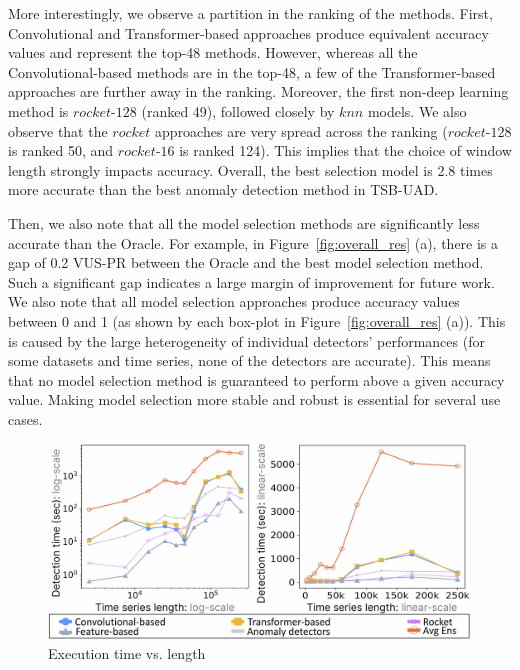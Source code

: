 More interestingly, we observe a partition in the ranking of the methods. First, Convolutional and Transformer-based approaches produce equivalent accuracy values and represent the top-48 methods. However, whereas all the Convolutional-based methods are in the top-48, a few of the Transformer-based approaches are further away in the ranking. Moreover, the first non-deep learning method is $rocket$-$128$ (ranked 49), followed closely by $knn$ models. We also observe that the $rocket$ approaches are very spread across the ranking ($rocket$-$128$ is ranked 50, and $rocket$-$16$ is ranked 124). This implies that the choice of window length strongly impacts accuracy. Overall, the best selection model is 2.8 times more accurate than the best anomaly detection method in TSB-UAD.

Then, we also note that all the model selection methods are significantly less accurate than the Oracle. For example, in Figure~\ref{fig:overall_res} (a), there is a gap of 0.2 VUS-PR between the Oracle and the best model selection method. Such a significant gap indicates a large margin of improvement for future work. We also note that all model selection approaches produce accuracy values between 0 and 1 (as shown by each box-plot in Figure~\ref{fig:overall_res} (a)). This is caused by the large heterogeneity of individual detectors' performances (for some datasets and time series, none of the detectors are accurate). This means that no model selection method is guaranteed to perform above a given accuracy value. Making model selection more stable and robust is essential for several use cases.


\begin{figure}
    \centering
    \includegraphics[width=0.92\linewidth]{figures/7_scalability_test.jpg}
    \vspace{-0.3cm}
    \caption{Execution time vs. length }%
    \vspace{-0.4cm}
    \label{fig:scalability}
\end{figure}

